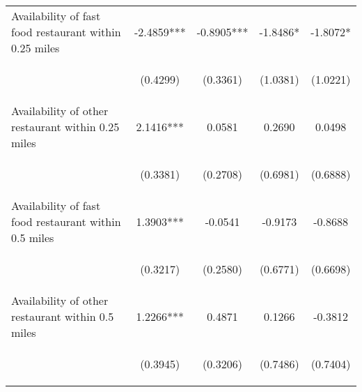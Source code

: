 \documentclass[11pt, a4paper]{article}
\begin{document}
\begin{table}
\begin{center}
{\begin{tabular}{lcccc}
Availability of fast food restaurant within 0.25 miles & -2.4859*** & -0.8905*** & -1.8486* & -1.8072* \\
\vspace{4pt} & \begin{footnotesize}(0.4299)\end{footnotesize} & \begin{footnotesize}(0.3361)\end{footnotesize} & \begin{footnotesize}(1.0381)\end{footnotesize} & \begin{footnotesize}(1.0221)\end{footnotesize} \\
Availability of other restaurant within 0.25 miles & 2.1416*** & 0.0581 & 0.2690 & 0.0498 \\
\vspace{4pt} & \begin{footnotesize}(0.3381)\end{footnotesize} & \begin{footnotesize}(0.2708)\end{footnotesize} & \begin{footnotesize}(0.6981)\end{footnotesize} & \begin{footnotesize}(0.6888)\end{footnotesize} \\
Availability of fast food restaurant within 0.5 miles & 1.3903*** & -0.0541 & -0.9173 & -0.8688 \\
\vspace{4pt} & \begin{footnotesize}(0.3217)\end{footnotesize} & \begin{footnotesize}(0.2580)\end{footnotesize} & \begin{footnotesize}(0.6771)\end{footnotesize} & \begin{footnotesize}(0.6698)\end{footnotesize} \\
Availability of other restaurant within 0.5 miles & 1.2266*** & 0.4871 & 0.1266 & -0.3812 \\
 & \begin{footnotesize}(0.3945)\end{footnotesize} & \begin{footnotesize}(0.3206)\end{footnotesize} & \begin{footnotesize}(0.7486)\end{footnotesize} & \begin{footnotesize}(0.7404)\end{footnotesize} \\

\end{tabular}}
\end{center}
\end{table}
\end{document}
